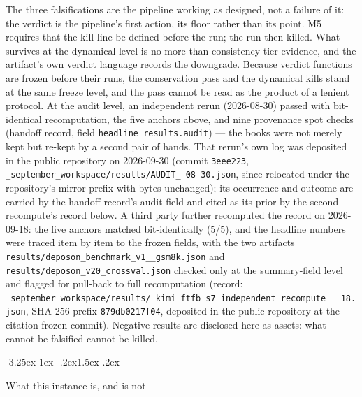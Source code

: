 \documentclass[11pt,a4paper]{article}
\makeatletter
\renewcommand\subsection{\@startsection{subsection}{2}{\z@}%
  {-3.25ex\@plus -1ex \@minus -.2ex}{1.5ex \@plus .2ex}%
  {\normalfont\large\bfseries\raggedright}}
\makeatother
\begin{document}
The three falsifications are the pipeline working as designed, not a failure of it: the verdict is the pipeline's first action, its floor rather than its point. M5 requires that the kill line be defined before the run; the run then killed. What survives at the dynamical level is no more than consistency-tier evidence, and the artifact's own verdict language records the downgrade. Because verdict functions are frozen before their runs, the conservation pass and the dynamical kills stand at the same freeze level, and the pass cannot be read as the product of a lenient protocol. At the audit level, an independent rerun (2026-08-30) passed with bit-identical recomputation, the five anchors above, and nine provenance spot checks (handoff record, field \texttt{headline\_\allowbreak results.audit}) — the books were not merely kept but re-kept by a second pair of hands. That rerun's own log was deposited in the public repository on 2026-09-30 (commit \texttt{3eee223}, \texttt{\_september\_\allowbreak workspace/\allowbreak results/\allowbreak AUDIT\_-08-30.json}, since relocated under the repository's mirror prefix with bytes unchanged); its occurrence and outcome are carried by the handoff record's audit field and cited as its prior by the second recompute's record below. A third party further recomputed the record on 2026-09-18: the five anchors matched bit-identically (5/5), and the headline numbers were traced item by item to the frozen fields, with the two artifacts \texttt{results/\allowbreak deposon\_\allowbreak benchmark\_\allowbreak v1\_\_\allowbreak gsm8k.json} and \texttt{results/\allowbreak deposon\_\allowbreak v20\_\allowbreak crossval.json} checked only at the summary-field level and flagged for pull-back to full recomputation (record: \texttt{\_september\_\allowbreak workspace/\allowbreak results/\allowbreak \_kimi\_\allowbreak ftfb\_\allowbreak s7\_\allowbreak independent\_\allowbreak recompute\_\_\_\allowbreak 18.json}, SHA-256 prefix \texttt{879db0217f04}, deposited in the public repository at the citation-frozen commit). Negative results are disclosed here as assets: what cannot be falsified cannot be killed.

\subsection{What this instance is, and is not}
\end{document}
